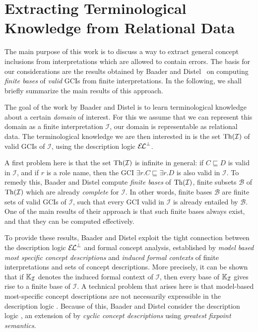 \section{Extracting Terminological Knowledge from Relational Data}
\label{sec:extr-term-knowl}

The main purpose of this work is to discuss a way to extract general concept inclusions
from interpretations which are allowed to contain errors.  The basis for our
considerations are the results obtained by Baader and
Distel~\cite{Diss-Felix,BaDi09,BaaderDistel08} on computing \emph{finite bases} of
\emph{valid} GCIs from finite interpretations.  In the following, we shall briefly
summarize the main results of this approach.

The goal of the work by Baader and Distel is to learn terminological knowledge about a
certain \emph{domain} of interest.  For this we assume that we can represent this domain
as a finite interpretation $\mathcal{I}$, \ie our domain is representable as relational
data.  The terminological knowledge we are then interested in is the set
$\operatorname{Th}(\mathcal{I})$ of valid GCIs of $\mathcal{I}$, using the description logic ${{\mathcal{E}\kern-.3ex\mathcal{L}}^\bot}$.

A first problem here is that the set $\operatorname{Th}(\mathcal{I})$ is infinite in general: if $C
\sqsubseteq D$ is valid in $\mathcal{I}$, and if $r$ is a role name, then the GCI $\exists
r. C \sqsubseteq \exists r. D$ is also valid in $\mathcal{I}$.  To remedy this, Baader and
Distel compute \emph{finite bases} of $\operatorname{Th}(\mathcal{I})$, \ie finite subsets $\mathcal{B}$
of $\operatorname{Th}(\mathcal{I})$ which are already \emph{complete} for $\mathcal{I}$.  In other
words, finite bases $\mathcal{B}$ are finite sets of valid GCIs of $\mathcal{I}$, such
that every GCI valid in $\mathcal{I}$ is already entailed by $\mathcal{B}$.  One of the
main results of their approach is that such finite bases always exist, and that they can
be computed effectively.

To provide these results, Baader and Distel exploit the tight connection between the
description logic ${{\mathcal{E}\kern-.3ex\mathcal{L}}^\bot}$ and formal concept analysis, established by \emph{model based
  most specific concept descriptions} and \emph{induced formal contexts} of finite
interpretations and sets of concept descriptions.  More precisely, it can be shown that if
${\mathbb{K}}_{\mathcal{I}}$ denotes the induced formal context of $\mathcal{I}$, then every
base of ${\mathbb{K}}_{\mathcal{I}}$ gives rise to a finite base of $\mathcal{I}$.  A technical
problem that arises here is that model-based most-specific concept descriptions are not
necessarily expressible in the description logic \ELbot.  Because of this, Baader and
Distel consider the description logic \ELgfpbot, an extension of \ELbot by \emph{cyclic
  concept descriptions} using \emph{greatest fixpoint semantics}.

